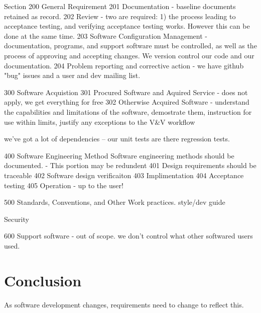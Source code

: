 \documentclass{anstrans}
\begin{document}
Section 200 General Requirement
201 Documentation - baseline documents retained as record.
202 Review  - two are required: 1) the process leading to acceptance testing, and verifying acceptance testing works. However this can be done at the same time.
203 Software Configuration Management - documentation, programs, and support software must be controlled, as well as the process of approving and accepting changes. We version control our code and our documentation.
204 Problem reporting and corrective action - we have github "bug" issues and a user and dev mailing list.



300 Software Acquistion
301 Procured Software and Aquired Service - does not apply, we get everything for free
302 Otherwise Acquired Software - understand the capabilities and limitations of the software, demostrate them, instruction for use within limits, justify any exceptions to the V\&V workflow

we've got a lot of dependencies -- our unit tests are there regression tests.

400 Software Engineering Method
Software engineering methods should be documented.
- This portion may be redundent
401 Design requirements should be traceable
402 Software design verificaiton
403 Implimentation
404 Acceptance testing
405 Operation - up to the user!

500 Standards, Conventions, and Other Work practices. style/dev guide

Security

600 Support software - out of scope. we don't control what other softwared users used. 



\section{Conclusion}

As software development changes, requirements need to change to reflect this.



\end{document}

